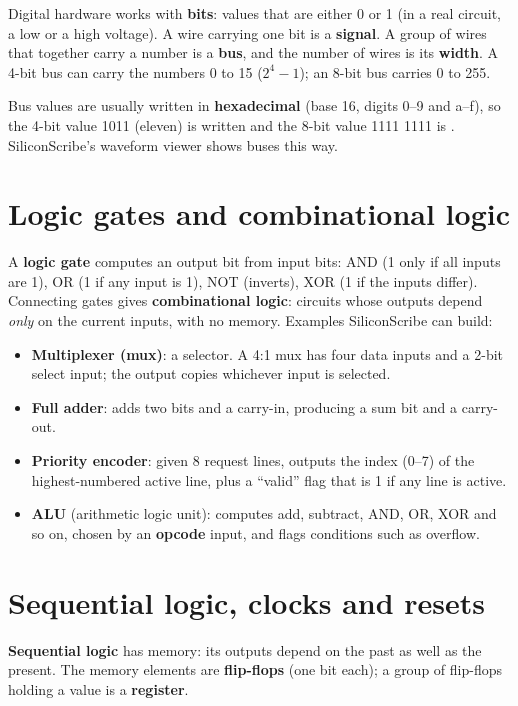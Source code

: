 Digital hardware works with \textbf{bits}: values that are either 0 or 1 (in a real circuit, a low or a high voltage). A wire carrying one bit is a \textbf{signal}. A group of wires that together carry a number is a \textbf{bus}, and the number of wires is its \textbf{width}. A 4-bit bus can carry the numbers 0 to 15 ($2^4-1$); an 8-bit bus carries 0 to 255.

Bus values are usually written in \textbf{hexadecimal} (base 16, digits 0--9 and a--f), so the 4-bit value 1011 (eleven) is written  and the 8-bit value 1111 1111 is . SiliconScribe's waveform viewer shows buses this way.

\section{Logic gates and combinational logic}

A \textbf{logic gate} computes an output bit from input bits: AND (1 only if all inputs are 1), OR (1 if any input is 1), NOT (inverts), XOR (1 if the inputs differ). Connecting gates gives \textbf{combinational logic}: circuits whose outputs depend \emph{only} on the current inputs, with no memory. Examples SiliconScribe can build:

\begin{itemize}
  \item \textbf{Multiplexer (mux)}: a selector. A 4:1 mux has four data inputs and a 2-bit select input; the output copies whichever input is selected.
  \item \textbf{Full adder}: adds two bits and a carry-in, producing a sum bit and a carry-out.
  \item \textbf{Priority encoder}: given 8 request lines, outputs the index (0--7) of the highest-numbered active line, plus a ``valid'' flag that is 1 if any line is active.
  \item \textbf{ALU} (arithmetic logic unit): computes add, subtract, AND, OR, XOR and so on, chosen by an \textbf{opcode} input, and flags conditions such as overflow.
\end{itemize}

\section{Sequential logic, clocks and resets}
\label{sec:seqlogic}

\textbf{Sequential logic} has memory: its outputs depend on the past as well as the present. The memory elements are \textbf{flip-flops} (one bit each); a group of flip-flops holding a value is a \textbf{register}.

